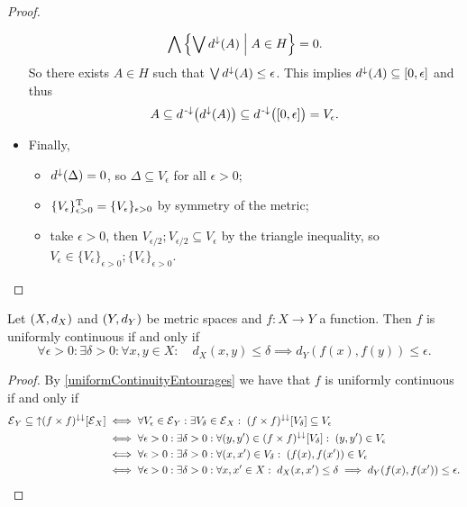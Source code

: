 \begin{proof}
\begin{itemize}
\[ \bigwedge \left\{ \bigvee d^\downarrow(A) \;\middle|\; A\in H \right\} = 0. \]
So there exists $A\in H$ such that $\bigvee d^\downarrow(A) \leq \epsilon$. This implies $d^\imf(A) \subseteq \interval{0,\epsilon}$ and thus
\[ A \subseteq d^\preimf\big(d^{\imf}(A)\big) \subseteq d^\preimf\big(\interval{0,\epsilon}\big) = V_\epsilon. \]
\item Finally,
\begin{itemize}
\item $d^{\downarrow}(\Delta) = 0$, so $\Delta \subseteq V_\epsilon$ for all $\epsilon > 0$;
\item $\{V_\epsilon\}_{\epsilon>0}^{\mathrm{T}} = \{V_\epsilon\}_{\epsilon>0}$ by symmetry of the metric;
\item take $\epsilon>0$, then $V_{\epsilon/2};V_{\epsilon/2} \subseteq V_\epsilon$ by the triangle inequality, so $V_\epsilon \in \{V_\epsilon\}_{\epsilon>0}; \{V_\epsilon\}_{\epsilon>0}$.
\end{itemize}
\end{itemize}
\end{proof}
\begin{corollary}
Let $\left( X, d_X \right)$ and $\left( Y, d_Y \right)$ be metric spaces and $f:X\to Y$ a function. Then $f$ is uniformly continuous \textup{if and only if}
\[ \forall \epsilon >0: \exists \delta >0: \forall x,y\in X: \quad d_X(x,y) \leq \delta \implies d_Y(f(x), f(y)) \leq \epsilon. \]
\end{corollary}
\begin{proof}
By \ref{uniformContinuityEntourages} we have that $f$ is uniformly continuous \textup{if and only if}
\begin{align*}
\operatorname{\mathcal{E}}_Y \subseteq \operatorname{\uparrow}(f\times f)^{\downarrow\downarrow}[\operatorname{\mathcal{E}}_X] &\iff \forall V_\epsilon \in \operatorname{\mathcal{E}}_Y: \exists V_\delta \in \operatorname{\mathcal{E}}_X: \; (f\times f)^{\downarrow\downarrow}[V_\delta] \subseteq V_\epsilon \\
&\iff \forall \epsilon>0: \exists \delta>0: \forall (y,y')\in (f\times f)^{\downarrow\downarrow}[V_\delta]: \; (y,y')\in V_\epsilon \\
&\iff \forall \epsilon>0: \exists \delta>0: \forall (x,x')\in V_\delta:\; (f(x),f(x'))\in V_\epsilon \\
&\iff \forall \epsilon>0: \exists \delta>0: \forall x,x'\in X: \; d_X(x,x')\leq \delta \implies d_Y(f(x),f(x'))\leq \epsilon.
\end{align*}
\end{proof}

